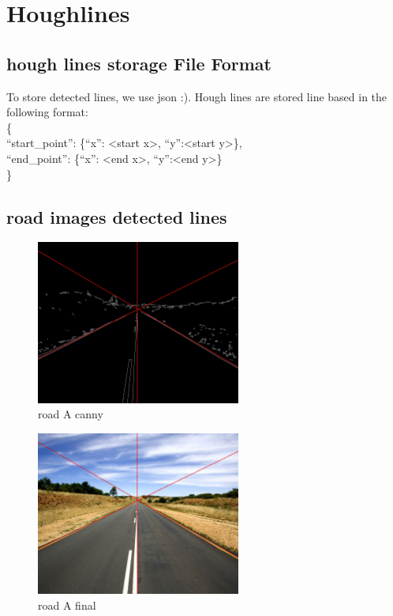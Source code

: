 \documentclass[11pt,a4paper]{article}
\begin{document}
  


\newpage
\tableofcontents
\thispagestyle{empty}
\clearpage
{}
\section{Houghlines}

\subsection{hough lines storage File Format}
To store detected lines, we use json :).
Hough lines are stored line based in the following format: 
\\
\{\\
``start\_point'': 
\{``x'':
\textless start x\textgreater, ``y'':\textless start y\textgreater\}, \\
``end\_point'': 
\{``x'':
\textless end x\textgreater, ``y'':\textless end y\textgreater\}
\\
\}

\subsection{road images detected lines}

\begin{figure}[H]
  \centering
  \includegraphics[width=0.6\textwidth]{road_A_canny}
  \caption{road A canny}
  \label{fig:canny_A}
\end{figure}

\begin{figure}[H]
  \centering
  \includegraphics[width=0.6\textwidth]{road_A_horizon}
  \caption{road A final}
  \label{fig:roadA}
\end{figure}
\end{document}
